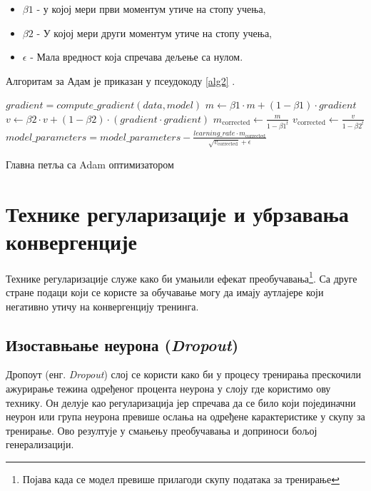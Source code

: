 \documentclass[a4paper, 12pt, master, utf8]{etf}
\begin{document}
\begin{itemize}
    \item \textbf{$\beta1$} - у којој мери први моментум утиче на стопу учења,
    \item \textbf{$\beta2$} - У којој мери други моментум утиче на стопу учења,
    \item \textbf{$\epsilon$} - Мала вредност која спречава дељење са нулом.
\end{itemize}

Алгоритам за Адам је приказан у псеудокоду \ref{alg2} .

\begin{algorithm}[H]
    \label{alg2}
    \DontPrintSemicolon
     {
         {
            $gradient = compute\_gradient(data, model)$ \;
            $m \gets \beta1 \cdot m + (1 - \beta1) \cdot gradient$ \;
            $v \gets \beta2 \cdot v + (1 - \beta2) \cdot (gradient \cdot gradient)$ \;
            $m_{\text{corrected}} \gets \frac{m}{1 - \beta1^t}$ \;
            $v_{\text{corrected}} \gets \frac{v}{1 - \beta2^t}$ \;
            $model\_parameters = model\_parameters - \frac{learning\_rate \cdot m_{\text{corrected}}}{\sqrt{v_{\text{corrected}}} + \epsilon}$ \;
        }
    }
    \caption{Главна петља са Adam оптимизатором}
\end{algorithm}

\section{Технике регуларизације и убрзавања конвергенције}
\label{sec:28}
Технике регуларизације служе како би умањили ефекат преобучавања\footnote{Појава када се модел превише прилагоди скупу података за тренирање}. Са друге стране 
подаци који се користе за обучавање могу да имају аутлајере који негативно утичу на конвергенцију тренинга.

\subsection{Изоставњање неурона (\textit{Dropout})}

Дропоут (енг. \textit{Dropout}) слој се користи како би у процесу тренирања прескочили ажурирање тежина одређеног процента неурона у слоју где користимо ову технику.
Он делује као регуларизација јер спречава да се било који појединачни неурон или група неурона превише ослања на одређене карактеристике у скупу за тренирање.
Ово резултује у смањењу преобучавања и доприноси бољој генерализацији. 
\end{document}
